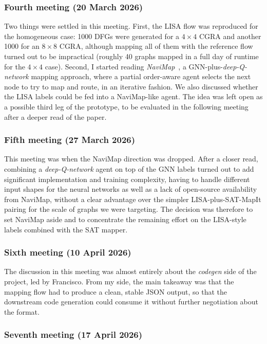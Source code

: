\documentclass[10pt]{article}
\begin{document}
\subsubsection{Fourth meeting (20 March 2026)}

Two things were settled in this meeting. First, the LISA flow was
reproduced for the homogeneous case: 1000 DFGs were generated for a
$4 \times 4$ CGRA and another 1000 for an $8 \times 8$ CGRA, although
mapping all of them with the reference flow turned out to be impractical
(roughly 40 graphs mapped in a full day of runtime for the $4 \times 4$
case). Second, I started reading \textit{NaviMap}~\cite{11310964}, a GNN-plus-\textit{deep-Q-network}
mapping approach, where a partial order-aware agent selects the next node to try to map and route, in an iterative fashion. We also discussed whether the LISA labels could be fed
into a NaviMap-like agent. The idea was left open as a possible third
leg of the prototype, to be evaluated in the following meeting after a
deeper read of the paper.

\subsubsection{Fifth meeting (27 March 2026)}

This meeting was when the NaviMap direction was dropped. After a closer
read, combining a \textit{deep-Q-network} agent on top of the GNN labels turned
out to add significant implementation and training complexity, having to
handle different input shapes for the neural networks as well as a lack of
open-source availability from NaviMap, without a clear advantage
over the simpler LISA-plus-SAT-MapIt pairing for the scale of graphs we
were targeting. The decision was therefore to set NaviMap aside and to
concentrate the remaining effort on the LISA-style labels combined with
the SAT mapper.

\subsubsection{Sixth meeting (10 April 2026)}

The discussion in this meeting was almost entirely about the
\textit{codegen} side of the project, led by Francisco. From my side,
the main takeaway was that the mapping flow had to produce a clean,
stable JSON output, so that the downstream code generation could
consume it without further negotiation about the format.

\subsubsection{Seventh meeting (17 April 2026)}
\end{document}
